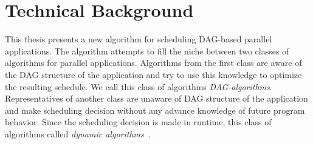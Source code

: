 \chapter{Technical Background}
\label{sec:state}






This thesis presents a new algorithm for scheduling DAG-based parallel
applications. The algorithm attempts to fill the niche between two
classes of algorithms for parallel applications. Algorithms from the
first class are aware of the DAG structure of the application and try
to use this knowledge to optimize the resulting schedule. We call this
class of algorithms \emph{DAG-algorithms}. Representatives of another
class are unaware of DAG structure of the application and make
scheduling decision without any advance knowledge of future program
behavior. Since the scheduling decision is made in runtime, this class
of algorithms called \emph{dynamic
  algorithms}~\cite{arabnejad2014list}.

